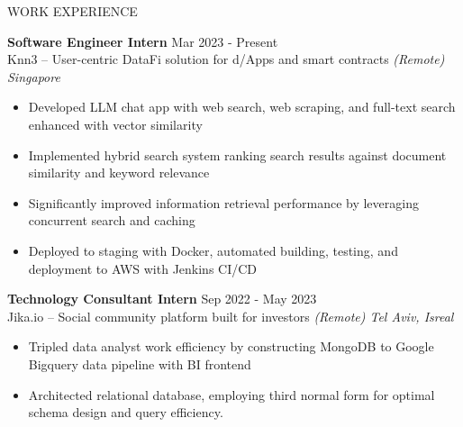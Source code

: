 \documentclass{resume} %
\begin{document}
\begin{rSection}{WORK EXPERIENCE}

	\textbf{Software Engineer Intern} \hfill Mar 2023 - Present\\
	Knn3 – User-centric DataFi solution for d/Apps and smart contracts  \hfill \textit{(Remote) Singapore}
	\begin{itemize}
		\item Developed LLM chat app with web search, web scraping, and full-text search enhanced with vector similarity
		\item Implemented hybrid search system ranking search results against document similarity and keyword relevance
		\item Significantly improved information retrieval performance by leveraging concurrent search and caching
		\item Deployed to staging with Docker, automated building, testing, and deployment to AWS with Jenkins CI/CD
	\end{itemize}

	\textbf{Technology Consultant Intern} \hfill Sep 2022 - May 2023\\
	Jika.io – Social community platform built for investors \hfill \textit{(Remote) Tel Aviv, Isreal}
	\begin{itemize}
		\item Tripled data analyst work efficiency by constructing MongoDB to Google Bigquery data pipeline with BI frontend
		\item Architected relational database, employing third normal form for optimal schema design and query efficiency.
	\end{itemize}

\end{rSection}

\end{document}
